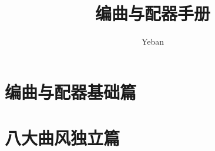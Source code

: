 \documentclass[UTF8,zihao=-4]{ctexbook}
\title{编曲与配器手册}
\author{Yeban}
\date{}
\begin{document}
\maketitle
\tableofcontents

\part{编曲与配器基础篇}










\part{八大曲风独立篇}









\printindex
\end{document}
